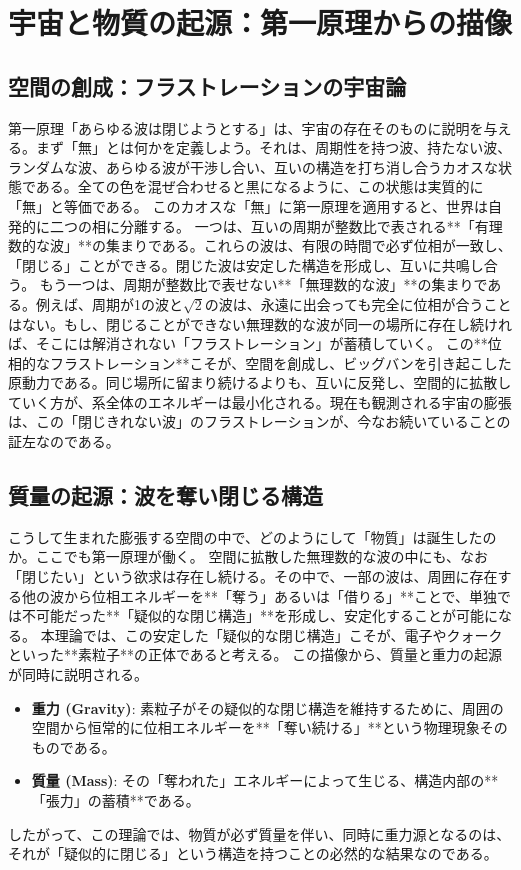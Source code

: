 \documentclass[11pt,a4paper,ja=standard]{ltjarticle}
\begin{document}
\section{宇宙と物質の起源：第一原理からの描像}
\subsection{空間の創成：フラストレーションの宇宙論}
第一原理「あらゆる波は閉じようとする」は、宇宙の存在そのものに説明を与える。まず「無」とは何かを定義しよう。それは、周期性を持つ波、持たない波、ランダムな波、あらゆる波が干渉し合い、互いの構造を打ち消し合うカオスな状態である。全ての色を混ぜ合わせると黒になるように、この状態は実質的に「無」と等価である。
このカオスな「無」に第一原理を適用すると、世界は自発的に二つの相に分離する。
一つは、互いの周期が整数比で表される**「有理数的な波」**の集まりである。これらの波は、有限の時間で必ず位相が一致し、「閉じる」ことができる。閉じた波は安定した構造を形成し、互いに共鳴し合う。
もう一つは、周期が整数比で表せない**「無理数的な波」**の集まりである。例えば、周期が1の波と$\sqrt{2}$の波は、永遠に出会っても完全に位相が合うことはない。もし、閉じることができない無理数的な波が同一の場所に存在し続ければ、そこには解消されない「フラストレーション」が蓄積していく。
この**位相的なフラストレーション**こそが、空間を創成し、ビッグバンを引き起こした原動力である。同じ場所に留まり続けるよりも、互いに反発し、空間的に拡散していく方が、系全体のエネルギーは最小化される。現在も観測される宇宙の膨張は、この「閉じきれない波」のフラストレーションが、今なお続いていることの証左なのである。
\subsection{質量の起源：波を奪い閉じる構造}
こうして生まれた膨張する空間の中で、どのようにして「物質」は誕生したのか。ここでも第一原理が働く。
空間に拡散した無理数的な波の中にも、なお「閉じたい」という欲求は存在し続ける。その中で、一部の波は、周囲に存在する他の波から位相エネルギーを**「奪う」あるいは「借りる」**ことで、単独では不可能だった**「疑似的な閉じ構造」**を形成し、安定化することが可能になる。
本理論では、この安定した「疑似的な閉じ構造」こそが、電子やクォークといった**素粒子**の正体であると考える。
この描像から、質量と重力の起源が同時に説明される。
\begin{itemize}
    \item \textbf{重力 (Gravity)}: 素粒子がその疑似的な閉じ構造を維持するために、周囲の空間から恒常的に位相エネルギーを**「奪い続ける」**という物理現象そのものである。
    \item \textbf{質量 (Mass)}: その「奪われた」エネルギーによって生じる、構造内部の**「張力」の蓄積**である。
\end{itemize}
したがって、この理論では、物質が必ず質量を伴い、同時に重力源となるのは、それが「疑似的に閉じる」という構造を持つことの必然的な結果なのである。
\end{document}
